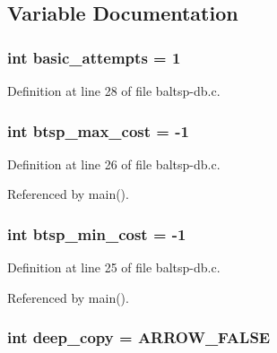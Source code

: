\subsection{Variable Documentation}
\hypertarget{bin_2baltsp-db_8c_227b7ec968925f365b96a92ace419c56}{
\subsubsection[{basic\_\-attempts}]{\setlength{\rightskip}{0pt plus 5cm}int {\bf basic\_\-attempts} = 1}}
\label{bin_2baltsp-db_8c_227b7ec968925f365b96a92ace419c56}




Definition at line 28 of file baltsp-db.c.\hypertarget{bin_2baltsp-db_8c_8135b6557d64f65441d8f07fdc21ffdc}{
\subsubsection[{btsp\_\-max\_\-cost}]{\setlength{\rightskip}{0pt plus 5cm}int {\bf btsp\_\-max\_\-cost} = -1}}
\label{bin_2baltsp-db_8c_8135b6557d64f65441d8f07fdc21ffdc}




Definition at line 26 of file baltsp-db.c.

Referenced by main().\hypertarget{bin_2baltsp-db_8c_97987334c96a847ff74c2c6c83d78a73}{
\subsubsection[{btsp\_\-min\_\-cost}]{\setlength{\rightskip}{0pt plus 5cm}int {\bf btsp\_\-min\_\-cost} = -1}}
\label{bin_2baltsp-db_8c_97987334c96a847ff74c2c6c83d78a73}




Definition at line 25 of file baltsp-db.c.

Referenced by main().\hypertarget{bin_2baltsp-db_8c_7298da576a5b127d04b4c46b3bc78821}{
\subsubsection[{deep\_\-copy}]{\setlength{\rightskip}{0pt plus 5cm}int {\bf deep\_\-copy} = ARROW\_\-FALSE}}
\label{bin_2baltsp-db_8c_7298da576a5b127d04b4c46b3bc78821}





